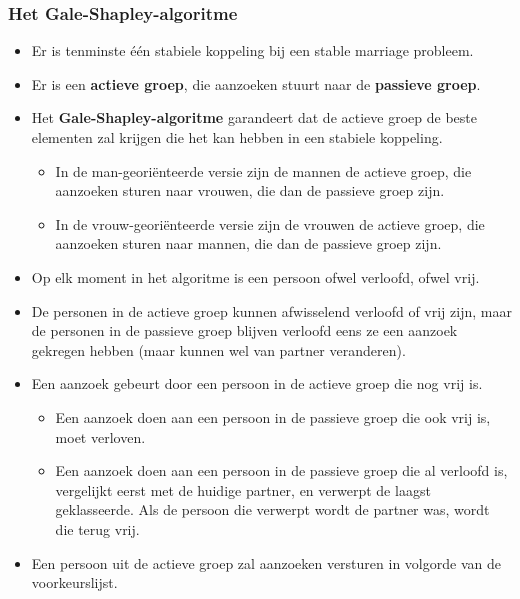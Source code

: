 \subsubsection{Het Gale-Shapley-algoritme}
\begin{itemize}
    \item Er is tenminste één stabiele koppeling bij een stable marriage probleem.
    \item Er is een \textbf{actieve groep}, die aanzoeken stuurt naar de \textbf{passieve groep}.
    \item Het \textbf{Gale-Shapley-algoritme} garandeert dat de actieve groep de beste elementen zal krijgen die het kan hebben in een stabiele koppeling.
    \begin{itemize}
        \item In de man-georiënteerde versie zijn de mannen de actieve groep, die aanzoeken sturen naar vrouwen, die dan de passieve groep zijn.
        \item In de vrouw-georiënteerde versie zijn de vrouwen de actieve groep, die aanzoeken sturen naar mannen, die dan de passieve groep zijn.
    \end{itemize}
    \item Op elk moment in het algoritme is een persoon ofwel verloofd, ofwel vrij.
    \item De personen in de actieve groep kunnen afwisselend verloofd of vrij zijn, maar de personen in de passieve groep blijven verloofd eens ze een aanzoek gekregen hebben (maar kunnen wel van partner veranderen).
    \item Een aanzoek gebeurt door een persoon in de actieve groep die nog vrij is.
    \begin{itemize}
        \item Een aanzoek doen aan een persoon in de passieve groep die ook vrij is, moet verloven.
        \item Een aanzoek doen aan een persoon in de passieve groep die al verloofd is, vergelijkt eerst met de huidige partner, en verwerpt de laagst geklasseerde. Als de persoon die verwerpt wordt de partner was, wordt die terug vrij.
    \end{itemize}
    \item Een persoon uit de actieve groep zal aanzoeken versturen in volgorde van de voorkeurslijst.

\end{itemize}

